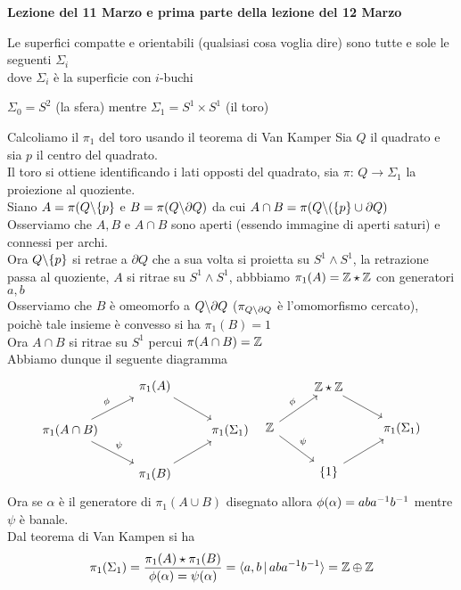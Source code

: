 

\textbf{Lezione del 11 Marzo e prima parte della lezione del 12  Marzo}
\begin{thm}[di classificazione]\bianco 
Le superfici compatte e orientabili (qualsiasi cosa voglia dire) sono tutte e sole le seguenti $\Sigma_i$ \\
dove $\Sigma_i$ \`e la superficie con $i$-buchi
\end{thm}
\begin{oss}$\Sigma_0=S^2$ (la sfera) mentre $\Sigma_1=S^1 \times S^1$ (il toro)
\end{oss}
Calcoliamo il $\pi_1$ del toro usando il teorema di Van Kamper
Sia $Q$ il quadrato e sia $p$ il centro del quadrato.\\
Il toro si ottiene identificando i lati opposti del quadrato, sia $\pi:\, Q \to \Sigma_1$ la proiezione al quoziente.\\
Siano $A=\pi(Q\backslash \{p\}$ e $B =\pi(Q \backslash \partial Q)$ da cui $A\cap B = \pi( Q \backslash (\{ p\} \cup \partial Q)$\\
Osserviamo che $A,B$ e $A \cap B$ sono aperti (essendo immagine di aperti saturi) e connessi per archi.\\
Ora $Q\backslash \{p\}$ si retrae a $\partial Q$ che a sua volta si proietta su $S^1 \wedge S^1$, la retrazione passa al quoziente, $A$ si ritrae su $S^1 \wedge S^1$, abbbiamo $\pi_1(A)= \mathbb{Z} \star \mathbb{Z}$ con generatori $a,b$\\
Osserviamo che $B$ \`e omeomorfo a $Q\backslash \partial Q $ ($\pi_{Q\backslash \partial Q}$ \`e l'omomorfismo cercato), poich\`e tale insieme \`e convesso si ha $\pi_1(B)=1$\\
Ora $A\cap B$ si ritrae su $S^1$ percui $\pi(A\cap B)=\mathbb{Z}$\\
Abbiamo dunque il seguente diagramma 
 $$ \begin{tikzcd}
 & \pi_1(A) \arrow[dr] \\ \pi_1(A\cap B) \arrow{ur}{\phi}  \arrow{rd}{\psi}& &\pi_1(\Sigma_1)\\& \pi_1(B) \arrow[ur]
\end{tikzcd}  \, \, \,  \begin{tikzcd}
 & \Z\star \Z \arrow[dr] \\ \Z \arrow{ur}{\phi}  \arrow{rd}{\psi}& &\pi_1(\Sigma_1)\\& \{ 1 \} \arrow[ur]
\end{tikzcd}$$ 
Ora se $\alpha$ \`e il generatore di $\pi_1(A\cup B)$ disegnato allora $\phi(\alpha)=aba^{-1} b^{-1}$ mentre $\psi$ \`e banale.\\ Dal teorema di Van Kampen si ha $$\pi_1(\Sigma_1)=\frac{\pi_1(A)\star \pi_1(B)}{\phi(\alpha)=\psi(\alpha)} = \langle a,b \, \vert \, ab a^{-1} b^{-1} \rangle = \mathbb{Z} \oplus \mathbb{Z}$$
